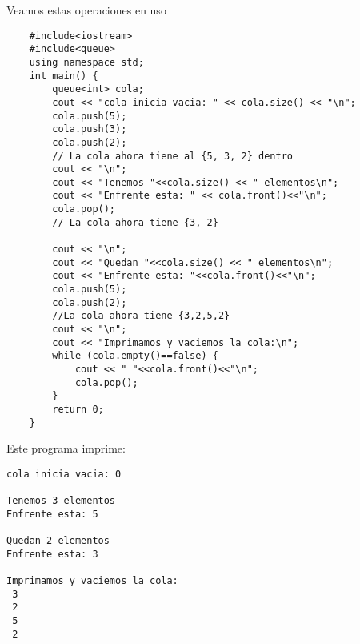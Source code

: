 Veamos estas operaciones en uso

\begin{lstlisting}
	#include<iostream>
	#include<queue>	
	using namespace std;		
	int main() {
		queue<int> cola;
		cout << "cola inicia vacia: " << cola.size() << "\n";
		cola.push(5);
		cola.push(3);
		cola.push(2);
		// La cola ahora tiene al {5, 3, 2} dentro
		cout << "\n";
		cout << "Tenemos "<<cola.size() << " elementos\n";
		cout << "Enfrente esta: " << cola.front()<<"\n";
		cola.pop();
		// La cola ahora tiene {3, 2}
		
		cout << "\n";
		cout << "Quedan "<<cola.size() << " elementos\n";
		cout << "Enfrente esta: "<<cola.front()<<"\n";
		cola.push(5);
		cola.push(2);
		//La cola ahora tiene {3,2,5,2}		
		cout << "\n";
		cout << "Imprimamos y vaciemos la cola:\n";
		while (cola.empty()==false) {
			cout << " "<<cola.front()<<"\n";
			cola.pop();
		}
		return 0;		
	}
\end{lstlisting}

Este programa imprime:

\begin{lstlisting}
cola inicia vacia: 0

Tenemos 3 elementos
Enfrente esta: 5

Quedan 2 elementos
Enfrente esta: 3

Imprimamos y vaciemos la cola:
 3
 2
 5
 2

\end{lstlisting}
